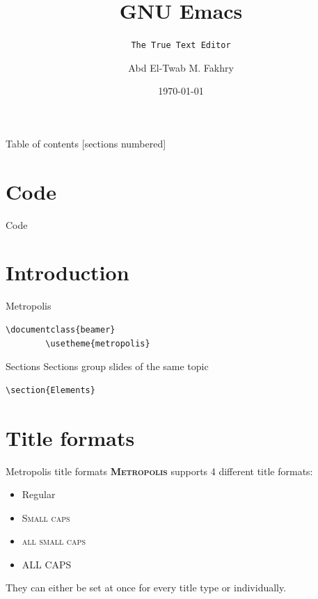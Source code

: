 \documentclass[aspectratio=169,usenames,dvipsnames,pdftex]{beamer}
\title{GNU Emacs}
\subtitle{\texttt{The True Text Editor}}
\date{\today}
\author{Abd El-Twab M. Fakhry}
\institute{Free Software Foundation}
\newcommand{\themename}{\textbf{\textsc{Metropolis}}\xspace}
\begin{document}
	\maketitle

	\begin{frame}{Table of contents}
		[sections numbered]
		\tableofcontents[hideallsubsections]
	\end{frame}

  \section{Code}

  \begin{frame}{Code}
    
  \end{frame}

	\section{Introduction}

	\begin{frame}[fragile]{Metropolis}
		\begin{verbatim}\documentclass{beamer}
		\usetheme{metropolis}\end{verbatim}
	\end{frame}

	\begin{frame}[fragile]{Sections}
		Sections group slides of the same topic
		\begin{verbatim}\section{Elements}\end{verbatim}
	\end{frame}

	\section{Title formats}

	\begin{frame}{Metropolis title formats}
		\themename supports 4 different title formats:
		\begin{itemize}
			\item Regular
			\item \textsc{Small caps}
			\item \textsc{all small caps}
			\item ALL CAPS
		\end{itemize}
		They can either be set at once for every title type or individually.
	\end{frame}
\end{document}
